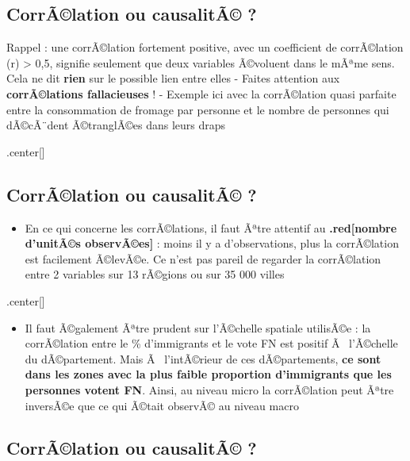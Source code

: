 \documentclass[]{article}
\providecommand{\tightlist}{%
  \setlength{\itemsep}{0pt}\setlength{\parskip}{0pt}}
\begin{document}
\subsection{CorrÃ©lation ou causalitÃ©
?}\label{corralation-ou-causalita}

Rappel : une corrÃ©lation fortement positive, avec un coefficient de
corrÃ©lation (r) \textgreater{} 0,5, signifie seulement que deux
variables Ã©voluent dans le mÃªme sens. Cela ne dit \textbf{rien} sur le
possible lien entre elles - Faites attention aux \textbf{corrÃ©lations
fallacieuses} ! - Exemple ici avec la corrÃ©lation quasi parfaite entre
la consommation de fromage par personne et le nombre de personnes qui
dÃ©cÃ¨dent Ã©tranglÃ©es dans leurs draps

.center{[}\href{http://tylervigen.com/spurious-correlations}{}{]}

\subsection{CorrÃ©lation ou causalitÃ©
?}\label{corralation-ou-causalita-1}

\begin{itemize}
\tightlist
\item
  En ce qui concerne les corrÃ©lations, il faut Ãªtre attentif au
  \textbf{.red{[}nombre d'unitÃ©s observÃ©es{]}} : moins il y a
  d'observations, plus la corrÃ©lation est facilement Ã©levÃ©e. Ce n'est
  pas pareil de regarder la corrÃ©lation entre 2 variables sur 13
  rÃ©gions ou sur 35 000 villes
\end{itemize}

.center{[}{]}

\begin{itemize}
\tightlist
\item
  Il faut Ã©galement Ãªtre prudent sur l'Ã©chelle spatiale utilisÃ©e :
  la corrÃ©lation entre le \% d'immigrants et le vote FN est positif Ã~
  l'Ã©chelle du dÃ©partement. Mais Ã~ l'intÃ©rieur de ces dÃ©partements,
  \textbf{ce sont dans les zones avec la plus faible proportion
  d'immigrants que les personnes votent FN}. Ainsi, au niveau micro la
  corrÃ©lation peut Ãªtre inversÃ©e que ce qui Ã©tait observÃ© au niveau
  macro
\end{itemize}

\subsection{CorrÃ©lation ou causalitÃ©
?}\label{corralation-ou-causalita-2}
\end{document}
